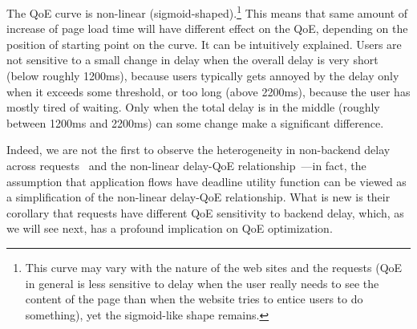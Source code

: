 The QoE curve is non-linear (sigmoid-shaped).\footnote{This curve may vary with the nature of the web sites and the requests (\eg QoE in general is less sensitive to delay when the user really needs to see the content of the page than when the website tries to entice users to do something), yet the sigmoid-like shape remains.}
This means that same amount of increase of page load time will have different effect on the QoE, depending on the position of starting point on the curve.
It can be intuitively explained. 
Users are not sensitive to a small change in delay when the overall delay is very short (below roughly 1200ms), because users typically gets annoyed by the delay only when it exceeds some threshold, or too long (above 2200ms), because the user has mostly tired of waiting. Only when the total delay is in the middle (roughly between 1200ms and 2200ms) can some change make a significant difference. 


Indeed, we are not the first to observe the heterogeneity in non-backend delay across requests~\cite{timeciard,dqbarge} and the non-linear delay-QoE relationship~\cite{d3tcp, mun chiang's work}---in fact, the assumption that application flows have deadline utility function can be viewed as a simplification of the non-linear delay-QoE relationship.
What is new is their corollary that requests have different QoE sensitivity to backend delay, which, as we will see next, has a profound implication on QoE optimization. %

